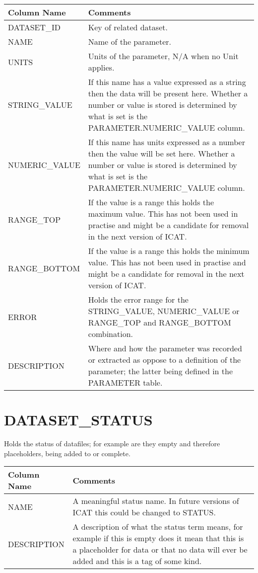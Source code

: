\documentclass{report}
\begin{document}
\begin{tabular}{|l|l|}
\hline
Column Name & Comments \\ \hline
DATASET\_ID & \multicolumn{1}{p{100mm}|}{
Key of related dataset.} \\ \hline
NAME & \multicolumn{1}{p{100mm}|}{
Name of the parameter.} \\ \hline
UNITS & \multicolumn{1}{p{100mm}|}{
Units of the parameter, N/A when no Unit applies.} \\ \hline
STRING\_VALUE & \multicolumn{1}{p{100mm}|}{
If this name has a value expressed as a string then the data will be present here. Whether a number or value is stored is determined by what is set is the PARAMETER.NUMERIC\_VALUE column.} \\ \hline
NUMERIC\_VALUE & \multicolumn{1}{p{100mm}|}{
If this name has units expressed as a number then the value will be set here. Whether a number or value is stored is determined by what is set is the PARAMETER.NUMERIC\_VALUE column.} \\ \hline
RANGE\_TOP & \multicolumn{1}{p{100mm}|}{
If the value is a range this holds the maximum value. This has not been used in practise and might be a candidate for removal in the next version of ICAT.} \\ \hline
RANGE\_BOTTOM & \multicolumn{1}{p{100mm}|}{
If the value is a range this holds the minimum value. This has not been used in practise and might be a candidate for removal in the next version of ICAT.} \\ \hline
ERROR & \multicolumn{1}{p{100mm}|}{
Holds the error range for the STRING\_VALUE, NUMERIC\_VALUE or RANGE\_TOP and RANGE\_BOTTOM combination.} \\ \hline
DESCRIPTION & \multicolumn{1}{p{100mm}|}{
Where and how the parameter was recorded or extracted as oppose to a definition of the parameter; the latter being defined in the PARAMETER table.} \\ \hline
\end{tabular}
\section{DATASET\_STATUS}

Holds the status of datafiles; for example are they empty and therefore placeholders, being added to or complete.\\

\begin{tabular}{|l|l|}
\hline
Column Name & Comments \\ \hline
NAME & \multicolumn{1}{p{100mm}|}{
A meaningful status name. In future versions of ICAT this could be changed to STATUS.} \\ \hline
DESCRIPTION & \multicolumn{1}{p{100mm}|}{
A description of what the status term means, for example if this is empty does it mean that this is a placeholder for data or that no data will ever be added and this is a tag of some kind.} \\ \hline
\end{tabular}
\end{document}
